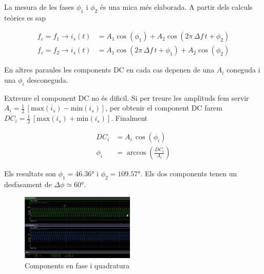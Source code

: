 \documentclass[catalan, a4paper, nobib]{tufte-handout}
\begin{document}
La mesura de les fases $\phi_1$ i $\phi_2$ és una mica més elaborada. A partir dels calculs teòrics es sap

\begin{align}
  f_c = f_1 \rightarrow i_s(t) &= A_1\cos{(\phi_1)} + A_2 \cos{(2\pi\,\Delta f\, t + \phi_2)} \\
  f_c = f_2 \rightarrow i_s(t) &= A_1\cos{(2\pi\,\Delta f\, t + \phi_1)} + A_2 \cos{(\phi_2)}
\end{align}

En altres paraules les components DC en cada cas depenen de una $A_i$ coneguda i una $\phi_i$ desconeguda.

Extreure el component DC no és dificil. Si per treure les amplituds fem servir $A_i=\frac{1}{2}\,\left[\text{max}(i_s)-\text{min}(i_s)\right]$, per obtenir el component DC farem ${DC}_i=\frac{1}{2}\,\left[\text{max}(i_s)+\text{min}(i_s)\right]$. Finalment

\begin{align}
  {DC}_i &= A_i \, \cos{(\phi_i)} \\
  \phi_i &= \arccos{\left(\frac{{DC}_i}{A_i}\right)}
\end{align}

Els resultats son $\phi_1=\ang{46.36}$ i $\phi_2=\ang{109.57}$. Els dos components tenen un desfasament de $\Delta\phi\simeq\ang{60}$.

\begin{figure}[!h]
  \begin{center}
    \includegraphics[width=205px]{q3_4.png}
  \end{center}
  \caption{Components en fase i quadratura}
\end{figure}
\end{document}
